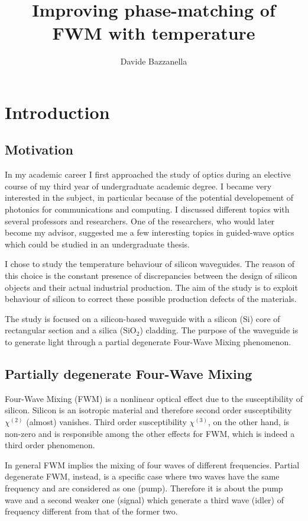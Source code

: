 \documentclass[12pt,a4paper,twoside]{article}
\author{Davide Bazzanella}
\title{Improving phase-matching of FWM with temperature}
\begin{document}

\cleardoublepage 
\setcounter{page}{3}
\tableofcontents

\cleardoublepage
{}

\section{Introduction}
\subsection{Motivation}
In my academic career I first approached the study of optics during an elective course of my third year of undergraduate academic degree.
I became very interested in the subject, in particular because of the potential developement of photonics for communications and computing.
I discussed different topics with several professors and researchers.
One of the researchers, who would later become my advisor, suggested me a few interesting topics in guided-wave optics which could be studied in an undergraduate thesis.

I chose to study the temperature behaviour of silicon waveguides.
The reason of this choice is the constant presence of discrepancies between the design of silicon objects and their actual industrial production.
The aim of the study is to exploit behaviour of silicon to correct these possible production defects of the materials.

The study is focused on a silicon-based waveguide with a silicon ($\mathrm{Si}$) core of rectangular section and a silica ($\mathrm{SiO}_2$) cladding.
The purpose of the waveguide is to generate light through a partial degenerate Four-Wave Mixing phenomenon.

\subsection{Partially degenerate Four-Wave Mixing}
Four-Wave Mixing (FWM) is a nonlinear optical effect due to the susceptibility of silicon.
Silicon is an isotropic material and therefore second order susceptibility $\chi^{(2)}$ (almost) vanishes.
Third order susceptibility $\chi^{(3)}$, on the other hand, is non-zero and is responsible among the other effects for FWM, which is indeed a third order phenomenon.

In general FWM implies the mixing of four waves of different frequencies.
Partial degenerate FWM, instead, is a specific case where two waves have the same frequency and are considered as one (pump).
Therefore it is about the pump wave and a second weaker one (signal) which generate a third wave (idler) of frequency different from that of the former two.
\end{document}
